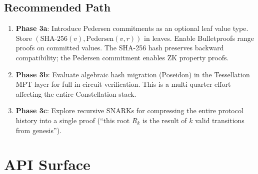 \documentclass[11pt,a4paper]{article}
\begin{document}
\subsection{Recommended Path}

\begin{enumerate}[nosep]
  \item \textbf{Phase 3a}: Introduce Pedersen commitments as an optional leaf
    value type. Store $(\text{SHA-256}(v), \text{Pedersen}(v, r))$ in leaves.
    Enable Bulletproofs range proofs on committed values. The SHA-256 hash
    preserves backward compatibility; the Pedersen commitment enables ZK
    property proofs.
  \item \textbf{Phase 3b}: Evaluate algebraic hash migration (Poseidon) in
    the Tessellation MPT layer for full in-circuit verification. This is a
    multi-quarter effort affecting the entire Constellation stack.
  \item \textbf{Phase 3c}: Explore recursive SNARKs for compressing the entire
    protocol history into a single proof (``this root $R_k$ is the result of
    $k$ valid transitions from genesis'').
\end{enumerate}


\section{API Surface}
\label{sec:api}
\end{document}
